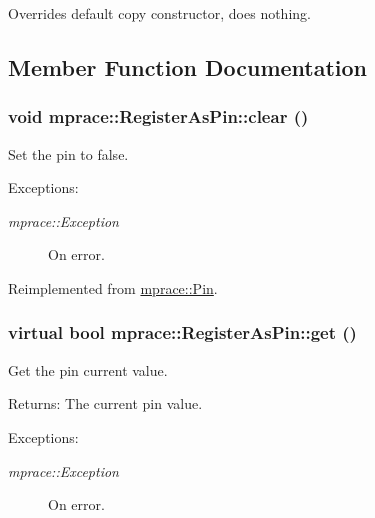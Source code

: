 Overrides default copy constructor, does nothing. 



\subsection{Member Function Documentation}
\hypertarget{classmprace_1_1RegisterAsPin_a5}{
\subsubsection[clear]{\setlength{\rightskip}{0pt plus 5cm}void mprace::Register\-As\-Pin::clear ()}}
\label{classmprace_1_1RegisterAsPin_a5}


Set the pin to false. 

\begin{Desc}
\item[Exceptions:]
\begin{description}
\item[{\em mprace::Exception}]On error.\end{description}
\end{Desc}


Reimplemented from \hyperlink{classmprace_1_1Pin_a4}{mprace::Pin}.\hypertarget{classmprace_1_1RegisterAsPin_a3}{
\subsubsection[get]{\setlength{\rightskip}{0pt plus 5cm}virtual bool mprace::Register\-As\-Pin::get ()}}
\label{classmprace_1_1RegisterAsPin_a3}


Get the pin current value. 

\begin{Desc}
\item[Returns:]The current pin value. \end{Desc}
\begin{Desc}
\item[Exceptions:]
\begin{description}
\item[{\em mprace::Exception}]On error.\end{description}
\end{Desc}


